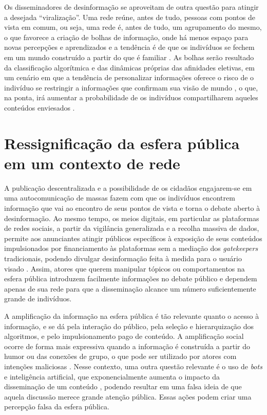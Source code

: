 \documentclass[portuguese]{textolivre}
\begin{document}
Os disseminadores de desinformação se aproveitam de outra questão para atingir a desejada “viralização”. Uma rede reúne, antes de tudo, pessoas com pontos de vista em comum, ou seja, uma rede é, antes de tudo, um agrupamento do mesmo, o que favorece a criação de bolhas de informação, onde há menos espaço para novas percepções e aprendizados e a tendência é de que os indivíduos se fechem em um mundo construído a partir do que é familiar \cite{pariser2012filtro, dominique2010informar}. As bolhas serão resultado da classificação algorítmica e das dinâmicas próprias das afinidades eletivas, em um cenário em que a tendência de personalizar informações oferece o risco de o indivíduo se restringir a informações que confirmam sua visão de mundo \cite{reis_onde_2021}, o que, na ponta, irá aumentar a probabilidade de os indivíduos compartilharem aqueles conteúdos enviesados \cite{baptista_understanding_2020}.


\section{Ressignificação da esfera pública em um contexto de rede}
A publicação descentralizada e a possibilidade de os cidadãos engajarem-se em uma autocomunicação de massas \cite{castells_sociedade_2012} fazem com que os indivíduos encontrem informação que vai ao encontro de seus pontos de vista e torna o debate aberto à desinformação. Ao mesmo tempo, os meios digitais, em particular as plataformas de redes sociais, a partir da vigilância generalizada e a recolha massiva de dados, permite aos anunciantes atingir públicos específicos à exposição de seus conteúdos impulsionados por financiamento às plataformas sem a mediação dos \emph{gatekeepers} tradicionais, podendo divulgar desinformação feita à medida para o usuário visado \cite{jungherr_disinformation_2021}. Assim, atores que querem manipular tópicos ou comportamentos na esfera pública introduzem facilmente informações no debate público e dependem apenas de sua rede para que a disseminação alcance um número suficientemente grande de indivíduos. 

A amplificação da informação na esfera pública é tão relevante quanto o acesso à informação, e se dá pela interação do público, pela seleção e hierarquização dos algoritmos, e pelo impulsionamento pago de conteúdo. A amplificação social ocorre de forma mais expressiva quando a informação é construída a partir do humor ou das conexões de grupo, o que pode ser utilizado por atores com intenções maliciosas \cite{jungherr_disinformation_2021}. Nesse contexto, uma outra questão relevante é o uso de \emph{bots} e inteligência artificial, que exponencialmente aumenta o impacto da disseminação de um conteúdo \cite{jeronimoespartaza022}, podendo resultar em uma falsa ideia de que aquela discussão merece grande atenção pública. Essas ações podem criar uma percepção falsa da esfera pública.
\end{document}

